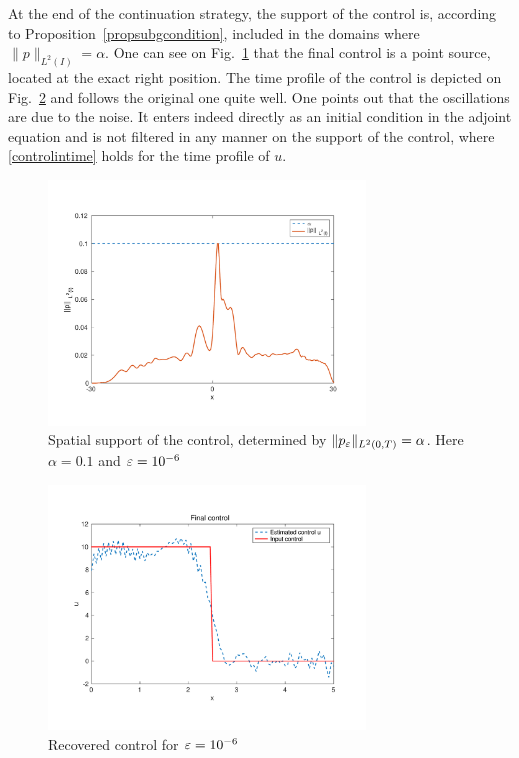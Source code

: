 At the end of the continuation strategy, the support of the control is, according to Proposition~\ref{propsubgcondition}, included in the domains where $\|p\|_{L^2(I)} = \alpha$. One can see on Fig.~\ref{support} that the final control is a point source, located at the exact right position. The time profile of the control is depicted on Fig.~\ref{recoveredcontrol} and follows the original one quite well. One points out that the oscillations are due to the noise. It enters indeed directly as an initial condition in the adjoint equation and is not filtered in any manner on the support of the control, where \eqref{controlintime} holds for the time profile of $u$.
\begin{figure}[!h]
\includegraphics[width = 0.75\textwidth]{images/normp.pdf}
\caption{Spatial support of the control, determined by $\lVert p_{\varepsilon}\rVert_{L^2(0,T)} = \alpha$. Here $\alpha = 0.1$ and $\varepsilon = 10^{-6}$}
\label{support}
\end{figure}
\begin{figure}[!h]
 \includegraphics[width = 0.75\textwidth]{images/ex1recoveredcontrol2.pdf}
 \caption{Recovered control for $\varepsilon = 10^{-6}$}
 \label{recoveredcontrol}
\end{figure}
